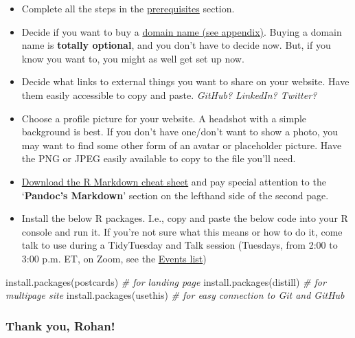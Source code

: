 \documentclass[
]{article}
\newenvironment{Shaded}{\begin{snugshade}}{\end{snugshade}}
\newcommand{\CommentTok}[1]{\textcolor[rgb]{0.56,0.35,0.01}{\textit{#1}}}
\newcommand{\FunctionTok}[1]{\textcolor[rgb]{0.00,0.00,0.00}{#1}}
\newcommand{\NormalTok}[1]{#1}
\newcommand{\StringTok}[1]{\textcolor[rgb]{0.31,0.60,0.02}{#1}}
\begin{document}
\begin{itemize}
\item
  Complete all the steps in the \protect\hyperlink{prereqs}{prerequisites} section.
\item
  Decide if you want to buy a \protect\hyperlink{domain}{domain name (see appendix)}. Buying a domain name is \textbf{totally optional}, and you don't have to decide now. But, if you know you want to, you might as well get set up now.
\item
  Decide what links to external things you want to share on your website. Have them easily accessible to copy and paste. \emph{GitHub? LinkedIn? Twitter?}
\item
  Choose a profile picture for your website. A headshot with a simple background is best. If you don't have one/don't want to show a photo, you may want to find some other form of an avatar or placeholder picture. Have the PNG or JPEG easily available to copy to the file you'll need.
\item
  \href{https://github.com/rstudio/cheatsheets/raw/master/rmarkdown-2.0.pdf}{Download the R Markdown cheat sheet} and pay special attention to the `\textbf{Pandoc's Markdown}' section on the lefthand side of the second page.
\item
  Install the below R packages. I.e., copy and paste the below code into your R console and run it. If you're not sure what this means or how to do it, come talk to use during a TidyTuesday and Talk session (Tuesdays, from 2:00 to 3:00 p.m. ET, on Zoom, see the \href{https://utoronto.sharepoint.com/sites/ArtSci-STA/ISSC/_layouts/15/Events.aspx?ListGuid=0679786c-8a7e-483c-9ec5-3845602a70e5}{Events list})
\end{itemize}

\begin{Shaded}
\begin{Highlighting}[]
\FunctionTok{install.packages}\NormalTok{(}\StringTok{\textquotesingle{}postcards\textquotesingle{}}\NormalTok{) }\CommentTok{\# for landing page}
\FunctionTok{install.packages}\NormalTok{(}\StringTok{\textquotesingle{}distill\textquotesingle{}}\NormalTok{) }\CommentTok{\# for multipage site}
\FunctionTok{install.packages}\NormalTok{(}\StringTok{\textquotesingle{}usethis\textquotesingle{}}\NormalTok{) }\CommentTok{\# for easy connection to Git and GitHub}
\end{Highlighting}
\end{Shaded}

\hypertarget{thank-you-rohan}{%
\subsubsection{Thank you, Rohan!}\label{thank-you-rohan}}
\end{document}
